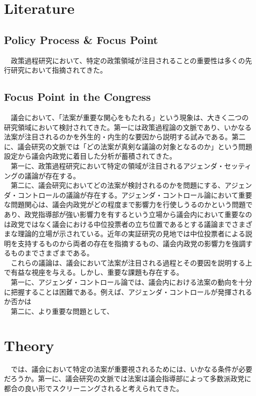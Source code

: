 \documentclass{article}
\begin{document}
\section*{Literature}
\subsection*{Policy Process \& Focus Point}
　政策過程研究において、特定の政策領域が注目されることの重要性は多くの先行研究において指摘されてきた。

\subsection*{Focus Point in the Congress}
　議会において、「法案が重要な関心をもたれる」という現象は、大きく二つの研究領域において検討されてきた。第一には政策過程論の文脈であり、いかなる法案が注目されるのかを外生的・内生的な要因から説明する試みである。第二に、議会研究の文脈では「どの法案が真剣な議論の対象となるのか」という問題設定から議会内政党に着目した分析が蓄積されてきた。\\
　第一に、政策過程研究において特定の領域が注目されるアジェンダ・セッティングの議論が存在する。\\
　第二に、議会研究においてどの法案が検討されるのかを問題にする、アジェンダ・コントロールの議論が存在する。アジェンダ・コントロール論において重要な問題関心は、議会内政党がどの程度まで影響力を行使しうるのかという問題であり、政党指導部が強い影響力を有するという立場\citep*{Cox2005-pn,Cox2007-xq}から議会内において重要なのは政党ではなく議会における中位投票者の立ち位置であるとする議論\citep*{Krehbiel2010-ob}までさまざまな理論的立場が示されている。近年の実証研究の見地では中位投票者による説明を支持するもの\citep*{Gray2019-sv}から両者の存在を指摘するもの\citep*{Crosson2019-xb}、議会内政党の影響力を強調するもの\citep*{Clark2012-lk}までさまざまである。\\
　これらの議論は、議会において法案が注目される過程とその要因を説明する上で有益な視座を与える。しかし、重要な課題も存在する。\\
　第一に、アジェンダ・コントロール論では、議会内における法案の動向を十分に把握することは困難である。例えば、アジェンダ・コントロールが発揮されるか否かは\\
　第二に、より重要な問題として、

\section*{Theory}
　では、議会において特定の法案が重要視されるためには、いかなる条件が必要だろうか。第一に、議会研究の文脈では法案は議会指導部によって多数派政党に都合の良い形でスクリーニングされると考えられてきた。
　
\end{document}
